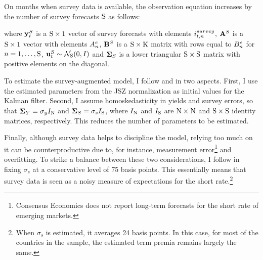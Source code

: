 {On months when survey data is available, the observation equation increases by the number of survey forecasts \(\mathrm{S}\) as follows:
	
\noindent where \(\mathbf{y}_{t}^{S}\) is a \(\mathrm{S} \times 1\) vector of survey forecasts with elements \(i_{t,n}^{survey}\), \(\mathbf{A}^{S}\) is a \(\mathrm{S} \times 1\) vector with elements \(A_{n}^{e}\), \(\mathbf{B}^{S}\) is a \(\mathrm{S} \times \mathrm{K}\) matrix with rows equal to \(B_{n}^{e}\) for \(n = 1, \ldots, \mathrm{S}\), \(\mathbf{u}_{t}^{S} \sim \mathcal{N}_{\mathrm{S}} (0,I) \) and \(\mathbf{\mathbf{\Sigma}}_{S}\) is a lower triangular \(\mathrm{S} \times \mathrm{S}\) matrix with positive elements on the diagonal.

To estimate the survey-augmented model, I follow \cite{Guimaraes:2014} and \cite{Lloyd:2018b} in two aspects. First, I use the estimated parameters from the JSZ normalization as initial values for the Kalman filter.
Second, I assume homoskedasticity in yields and survey errors, so that \(\mathbf{\mathbf{\Sigma}}_{Y} = \sigma_y I_{\mathrm{N}}\) and \(\mathbf{\mathbf{\Sigma}}_{S} = \sigma_s I_{\mathrm{S}}\), where \(I_{\mathrm{N}}\) and \(I_{\mathrm{S}}\) are \(\mathrm{N} \times \mathrm{N}\) and \(\mathrm{S} \times \mathrm{S}\) identity matrices, respectively.
This reduces the number of parameters to be estimated.

Finally, although survey data helps to discipline the model, relying too much on it can be counterproductive due to, for instance, measurement error\footnote{ Consensus Economics does not report long-term forecasts for the short rate of emerging markets.} and overfitting. 
To strike a balance between these two considerations, I follow \cite{KimOrphanides:2012} in fixing \(\sigma_s\) at a conservative level of 75 basis points. This essentially means that survey data is seen as a noisy measure of expectations for the short rate.\footnote{ When \(\sigma_s\) is estimated, it averages 24 basis points. In this case, for most of the countries in the sample, the estimated term premia remains largely the same.}


}
